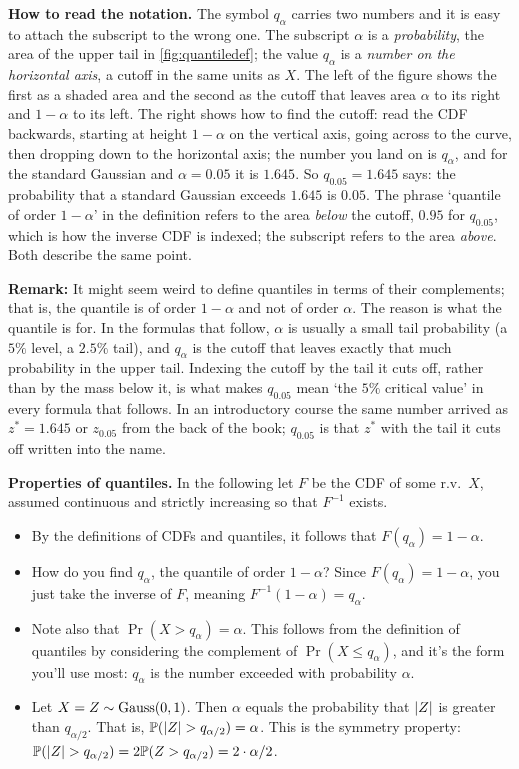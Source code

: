 \textbf{How to read the notation.}
The symbol $q_\alpha$ carries two numbers and it is easy to attach the subscript to the wrong one.
The subscript $\alpha$ is a \textit{probability}, the area of the upper tail in \cref{fig:quantiledef}; the value $q_\alpha$ is a \textit{number on the horizontal axis}, a cutoff in the same units as $X$.
The left of the figure shows the first as a shaded area and the second as the cutoff that leaves area $\alpha$ to its right and $1 - \alpha$ to its left.
The right shows how to find the cutoff: read the CDF backwards, starting at height $1 - \alpha$ on the vertical axis, going across to the curve, then dropping down to the horizontal axis; the number you land on is $q_\alpha$, and for the standard Gaussian and $\alpha = 0.05$ it is $1.645$.
So $q_{0.05} = 1.645$ says: the probability that a standard Gaussian exceeds $1.645$ is $0.05$.
The phrase `quantile of order $1 - \alpha$' in the definition refers to the area \textit{below} the cutoff, $0.95$ for $q_{0.05}$, which is how the inverse CDF is indexed; the subscript refers to the area \textit{above}.
Both describe the same point.

\textbf{Remark:} It might seem weird to define quantiles in terms of their complements;
that is, the quantile is of order $1 - \alpha$ and not of order $\alpha$.
The reason is what the quantile is for.
In the formulas that follow, $\alpha$ is usually a small tail probability (a $5\%$ level, a $2.5\%$ tail), and $q_\alpha$ is the cutoff that leaves exactly that much probability in the upper tail.
Indexing the cutoff by the tail it cuts off, rather than by the mass below it, is what makes $q_{0.05}$ mean `the $5\%$ critical value' in every formula that follows.
In an introductory course the same number arrived as $z^* = 1.645$ or $z_{0.05}$ from the back of the book; $q_{0.05}$ is that $z^*$ with the tail it cuts off written into the name.

\textbf{Properties of quantiles.}
In the following let $F$ be the CDF of some r.v.\ $X$, assumed continuous and strictly increasing so that $F^{-1}$ exists.
\begin{itemize}
\item By the definitions of CDFs and quantiles, it follows that $F(q_{\alpha}) = 1 - \alpha$.
\item How do you find $q_{\alpha}$, the quantile of order $1-\alpha$?
Since $F(q_{\alpha}) = 1 - \alpha$, you just take the inverse of $F$, meaning $F^{-1}(1-\alpha) = q_{\alpha}$.
\item Note also that $\Pr(X > q_{\alpha}) = \alpha$.
This follows from the definition of quantiles by considering the complement of $\Pr(X \leq q_{\alpha})$, and it's the form you'll use most: $q_\alpha$ is the number exceeded with probability $\alpha$.
\item Let $X = Z \sim \text{Gauss}(0,1)$.
Then $\alpha$ equals the probability that $\lvert Z\rvert$ is greater than $q_{\alpha/2}$.
That is, $\mathbb{P}(\lvert Z\rvert > q_{\alpha/2}) = \alpha$.
This is the symmetry property: $\mathbb{P}(\lvert Z\rvert > q_{\alpha/2}) = 2\mathbb{P}(Z > q_{\alpha/2}) = 2 \cdot \alpha/2$.
\end{itemize}

